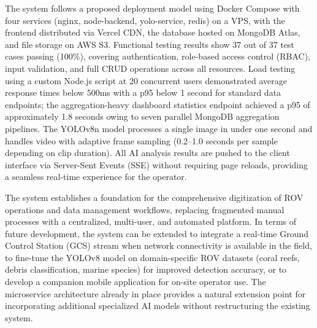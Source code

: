 \documentclass[../DoAn.tex]{subfiles}
\begin{document}
{The system follows a proposed deployment model using Docker Compose with four services (nginx, node-backend, yolo-service, redis) on a VPS, with the frontend distributed via Vercel CDN, the database hosted on MongoDB Atlas, and file storage on AWS S3. Functional testing results show 37 out of 37 test cases passing (100\%), covering authentication, role-based access control (RBAC), input validation, and full CRUD operations across all resources. Load testing using a custom Node.js script at 20 concurrent users demonstrated average response times below 500ms with a p95 below 1 second for standard data endpoints; the aggregation-heavy dashboard statistics endpoint achieved a p95 of approximately 1.8 seconds owing to seven parallel MongoDB aggregation pipelines. The YOLOv8n model processes a single image in under one second and handles video with adaptive frame sampling (0.2--1.0 seconds per sample depending on clip duration). All AI analysis results are pushed to the client interface via Server-Sent Events (SSE) without requiring page reloads, providing a seamless real-time experience for the operator.

The system establishes a foundation for the comprehensive digitization of ROV operations and data management workflows, replacing fragmented manual processes with a centralized, multi-user, and automated platform. In terms of future development, the system can be extended to integrate a real-time Ground Control Station (GCS) stream when network connectivity is available in the field, to fine-tune the YOLOv8 model on domain-specific ROV datasets (coral reefs, debris classification, marine species) for improved detection accuracy, or to develop a companion mobile application for on-site operator use. The microservice architecture already in place provides a natural extension point for incorporating additional specialized AI models without restructuring the existing system.

}%
\end{document}
